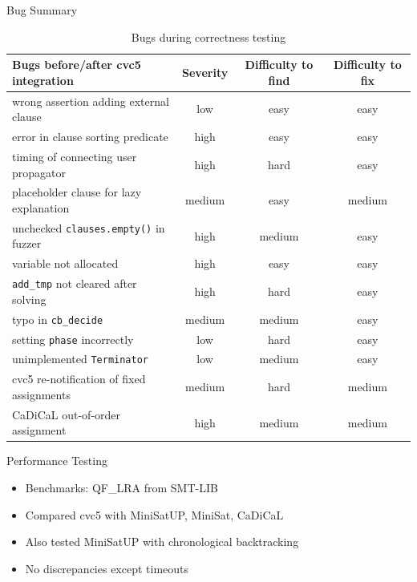 \documentclass{beamer}
\newcommand*{\code}[1]{\lstinline[basicstyle=\ttfamily, breaklines]|#1|}
\begin{document}
\begin{frame}{Bug Summary}
  \scriptsize
  \begin{table}
    \centering
    \begin{tabular}{|l|c|c|c|}
      \hline
      \textbf{Bugs before/after cvc5 integration} & \textbf{Severity} & \textbf{Difficulty to find} & \textbf{Difficulty to fix} \\
      \hline
      wrong assertion adding external clause & low & easy & easy \\
      error in clause sorting predicate & high & easy & easy \\
      timing of connecting user propagator & high & hard & easy \\
      placeholder clause for lazy explanation & medium & easy & medium \\
      \hline
      unchecked \code{clauses.empty()} in fuzzer & high & medium & easy \\
      variable not allocated & high & easy & easy \\
      \code{add_tmp} not cleared after solving & high & hard & easy \\
      typo in \code{cb_decide} & medium & medium & easy \\
      setting \code{phase} incorrectly & low & hard & easy \\
      unimplemented \code{Terminator} & low & medium & easy \\
      \hline
      cvc5 re-notification of fixed assignments & medium & hard & medium \\
      CaDiCaL out-of-order assignment & high & medium & medium \\
      \hline
    \end{tabular}
    \caption{Bugs during correctness testing}
  \end{table}
\end{frame}

\begin{frame}{Performance Testing}
  \begin{itemize}
    \item Benchmarks: QF\_LRA from SMT-LIB
    \item Compared cvc5 with MiniSatUP, MiniSat, CaDiCaL
    \item Also tested MiniSatUP with chronological backtracking
    \item No discrepancies except timeouts
  \end{itemize}
\end{frame}
\end{document}
